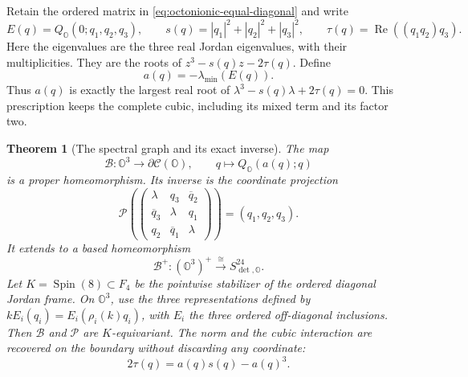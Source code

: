 \documentclass[11pt]{article}
\newtheorem{theorem}{Theorem}[section]
\theoremstyle{definition}
\begin{document}
Retain the ordered matrix in \eqref{eq:octonionic-equal-diagonal} and write
\[
 E(q)=Q_{\mathbb O}(0;q_1,q_2,q_3),\qquad
 s(q)=|q_1|^2+|q_2|^2+|q_3|^2,\qquad
 \tau(q)=\operatorname{Re}((q_1q_2)q_3).
\]
Here the eigenvalues are the three real Jordan eigenvalues, with their
multiplicities. They are the roots of
\(z^3-s(q)z-2\tau(q)\). Define
\[
 a(q)=-\lambda_{\min}(E(q)).
\]
Thus \(a(q)\) is exactly the largest real root of
\(\lambda^3-s(q)\lambda+2\tau(q)=0\). This prescription keeps the
complete cubic, including its mixed term and its factor two.

\begin{theorem}[The spectral graph and its exact inverse]
\label{tri:thm:spectral-graph}
The map
\begin{equation}
 \mathcal B:\mathbb O^3\longrightarrow\partial\mathcal C(\mathbb O),
 \qquad q\longmapsto Q_{\mathbb O}(a(q);q)
 \label{tri:eq:spectral-graph}
\end{equation}
is a proper homeomorphism. Its inverse is the coordinate projection
\[
 \mathcal P\left(
 \begin{pmatrix}
 \lambda&q_3&\overline q_2\\
 \overline q_3&\lambda&q_1\\
 q_2&\overline q_1&\lambda
 \end{pmatrix}\right)=(q_1,q_2,q_3).
\]
It extends to a based homeomorphism
\[
 \mathcal B^+:(\mathbb O^3)^+
       \xrightarrow{\ \cong\ }S_{\det,\mathbb O}^{24}.
\]
Let \(K=\operatorname{Spin}(8)\subset F_4\) be the pointwise stabilizer
of the ordered diagonal Jordan frame. On \(\mathbb O^3\), use the
three representations defined by
\(kE_i(q_i)=E_i(\rho_i(k)q_i)\), with \(E_i\) the three ordered
off-diagonal inclusions. Then \(\mathcal B\) and \(\mathcal P\) are
\(K\)-equivariant. The norm and the cubic interaction are recovered
on the boundary without discarding any coordinate:
\begin{equation}
 2\tau(q)=a(q)s(q)-a(q)^3.
 \label{tri:eq:boundary-triality}
\end{equation}
\end{theorem}
\end{document}
